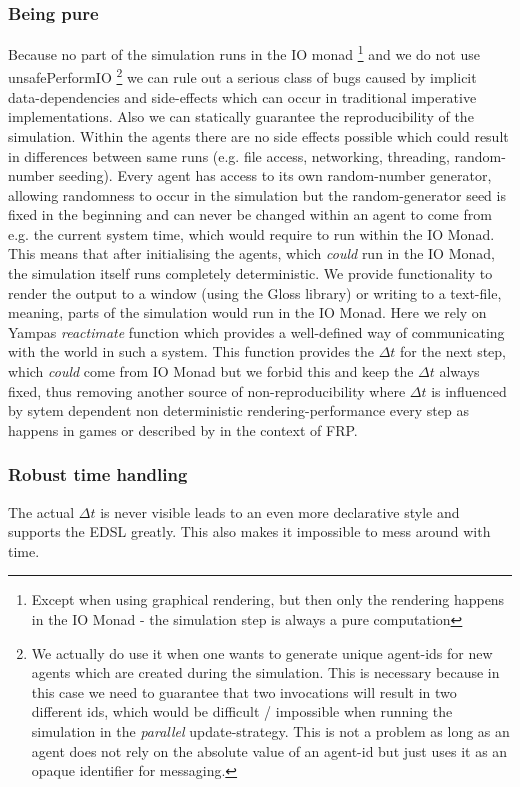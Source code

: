 \subsubsection{Being pure}
Because no part of the simulation runs in the IO monad \footnote{Except when using graphical rendering, but then only the rendering happens in the IO Monad - the simulation step is always a pure computation} and we do not use unsafePerformIO \footnote{We actually do use it when one wants to generate unique agent-ids for new agents which are created during the simulation. This is necessary because in this case we need to guarantee that two invocations will result in two different ids, which would be difficult / impossible when running the simulation in the \textit{parallel} update-strategy. This is not a problem as long as an agent does not rely on the absolute value of an agent-id but just uses it as an opaque identifier for messaging.} we can rule out a serious class of bugs caused by implicit data-dependencies and side-effects which can occur in traditional imperative implementations.
Also we can statically guarantee the reproducibility of the simulation. Within the agents there are no side effects possible which could result in differences between same runs (e.g. file access, networking, threading, random-number seeding). Every agent has access to its own random-number generator, allowing randomness to occur in the simulation but the random-generator seed is fixed in the beginning and can never be changed within an agent to come from e.g. the current system time, which would require to run within the IO Monad. This means that after initialising the agents, which \textit{could} run in the IO Monad, the simulation itself runs completely deterministic.
We provide functionality to render the output to a window (using the Gloss library) or writing to a text-file, meaning, parts of the simulation would run in the IO Monad. Here we rely on Yampas \textit{reactimate} function which provides a well-defined way of communicating with the world in such a system. This function provides the $\Delta t$ for the next step, which \textit{could} come from IO Monad but we forbid this and keep the $\Delta t$ always fixed, thus removing another source of non-reproducibility where $\Delta t$ is influenced by sytem dependent non deterministic rendering-performance every step as happens in games or described by \cite{perez_testing_2017} in the context of FRP.

\subsubsection{Robust time handling}
The actual $\Delta t$ is never visible leads to an even more declarative style and supports the EDSL greatly. This also makes it impossible to mess around with time.

